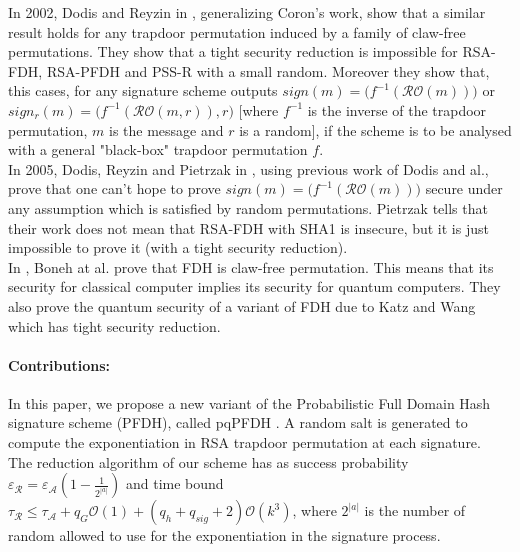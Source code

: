 \documentclass[a4paper,11pt]{article}
\begin{document}
In 2002, Dodis and Reyzin in \cite{Dodis}, generalizing Coron's work, show that a similar result holds for any trapdoor
 permutation induced by a family of claw-free permutations. They show that a tight security reduction is impossible for RSA-FDH, RSA-PFDH and PSS-R with a small random. Moreover they show that, this cases, for any signature scheme outputs $sign(m)=\big(f^{-1}(\mathcal{RO}(m))\big)$ or $sign_{r}(m)=\big(f^{-1}(\mathcal{RO}(m, r)), r\big)$ [where $f^{-1}$ is the inverse of the trapdoor permutation, $m$ is the message and $r$ is a random], if the scheme is to be analysed with a general "black-box" trapdoor permutation $f$.\\
In 2005, Dodis, Reyzin and Pietrzak in \cite{Dodis2},  using previous work of Dodis and al., prove that one can't hope to prove  $sign(m)=\big(f^{-1}(\mathcal{RO}(m))\big)$ secure under any assumption which is satisfied by random permutations. Pietrzak tells that their work does not mean that  RSA-FDH with SHA1  is insecure,  but it is just impossible to prove it (with a tight security reduction).\\
In \cite{pqROM}, Boneh at al. prove that FDH is claw-free permutation. This means that its security for classical computer implies its security for quantum computers. They also prove the quantum security of a variant of FDH due to Katz and Wang \cite{Katz} which has tight security reduction.
\paragraph{Contributions:}
In this paper, we propose a new variant of the Probabilistic Full Domain Hash signature scheme (PFDH), called pqPFDH . A random salt is generated to compute the exponentiation in RSA trapdoor permutation at each signature.\\
The reduction algorithm of our scheme has as success probability $\varepsilon_{\mathcal{R}} = \varepsilon_{\mathcal{A}}(1-\frac{1}{2^{|a|}})$ and time bound $\tau_{\mathcal{R}}\leq \tau_{\mathcal{A}} + q_{G}\mathcal{O}(1) + (q_{h}+ q_{sig}+2)\mathcal{O}(k^{3})$, where $2^{|a|}$ is the number of random allowed to use  for the exponentiation in the signature process.
\end{document}
